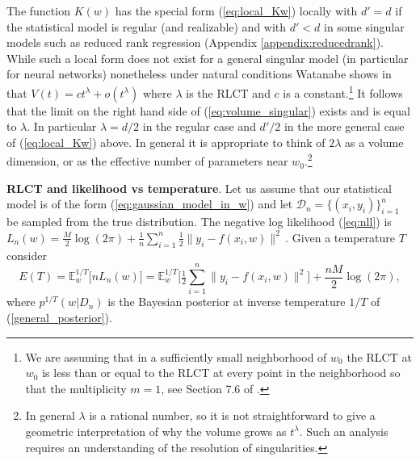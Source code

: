 \documentclass{article} %
\begin{document}
The function $K(w)$ has the special form (\ref{eq:local_Kw}) locally with $d' = d$ if the statistical model is regular (and realizable) and with $d' < d$ in some singular models such as reduced rank regression (Appendix \ref{appendix:reducedrank}). While such a local form does not exist for a general singular model (in particular for neural networks) nonetheless under natural conditions Watanabe shows in \citet[Theorem 7.1]{watanabe_algebraic_2009} that
$
V(t) = c t^\lambda + o( t^\lambda)
$
where $\lambda$ is the RLCT and $c$ is a constant.\footnote{We are assuming that in a sufficiently small neighborhood of $w_0$ the RLCT at $w_0$ is less than or equal to the RLCT at every point in the neighborhood so that the multiplicity $m = 1$, see Section 7.6 of \citep{watanabe_algebraic_2009}.} It follows that the limit on the right hand side of  (\ref{eq:volume_singular}) exists and is equal to $\lambda$. In particular $\lambda = d/2$ in the regular case and $d'/2$ in the more general case of (\ref{eq:local_Kw}) above. In general it is appropriate to think of $2 \lambda$ as a volume dimension, or as the effective number of parameters near $w_0$.\footnote{In general $\lambda$ is a rational number, so it is not straightforward to give a geometric interpretation of why the volume grows as $t^\lambda$. Such an analysis requires an understanding of the resolution of singularities.}


\textbf{RLCT and likelihood vs temperature}. Let us assume that our statistical model is of the form (\ref{eq:gaussian_model_in_w}) and let $\mathcal D_n = \{ (x_i,y_i) \}_{i=1}^n$ be sampled from the true distribution. The negative log likelihood (\ref{eq:nll}) is
$
L_n(w) = \frac{M}{2} \log(2\pi) + \frac{1}{n} \sum_{i=1}^n \frac{1}{2} \| y_i - f(x_i,w) \|^2\,.
$
Given a temperature $T$ consider
$$
E(T) = \mathbb{E}^{1/T}_w\big[nL_n(w) \big] = \mathbb{E}_w^{1/T}\Big[ \tfrac{1}{2} \sum_{i=1}^n \| y_i - f(x_i, w) \|^2 \Big] + \frac{nM}{2} \log(2\pi),
$$
where $p^{1/T}(w|D_n)$ is the Bayesian posterior at inverse temperature $1/T$ of (\ref{general_posterior}).
\end{document}
